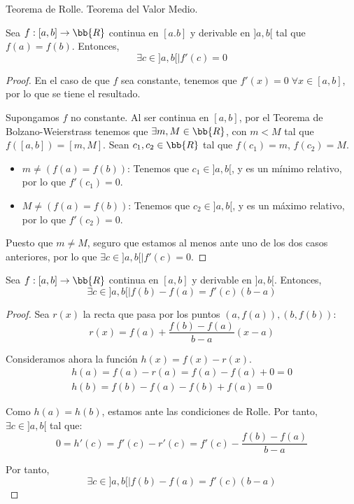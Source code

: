 \documentclass[12pt]{article}
\begin{document}
    \begin{ejercicio} 
Teorema de Rolle. Teorema del Valor Medio.

\begin{teo} 
    Sea $f:[a,b] \to \bb{R}$ continua en $[a.b]$ y derivable en $]a,b[$ tal que $f(a)=f(b)$. Entonces, $$\exists c\in ]a,b[ \mid f'(c)=0$$
\end{teo}
\begin{proof}
    En el caso de que $f$ sea constante, tenemos que $f'(x)=0\;\forall x\in [a,b]$, por lo que se tiene el resultado.

    Supongamos $f$ no constante. Al ser continua en $[a,b]$, por el Teorema de Bolzano-Weierstrass tenemos que $\exists m,M\in \bb{R}$, con $m<M$ tal que $f([a,b])=[m,M]$. Sean $c_1, c_2\in \bb{R}$ tal que $f(c_1)=m$, $f(c_2)=M$.
    \begin{itemize}
        \item \underline{$m\neq (f(a)=f(b))$}: Tenemos que $c_1\in ]a,b[$, y es un mínimo relativo, por lo que $f'(c_1)=0$.

        \item \underline{$M\neq (f(a)=f(b))$}: Tenemos que $c_2\in ]a,b[$, y es un máximo relativo, por lo que $f'(c_2)=0$.
    \end{itemize}
    Puesto que $m\neq M$, seguro que estamos al menos ante uno de los dos casos anteriores, por lo que $\exists c\in ]a,b[\mid f'(c)=0$.
\end{proof}

\begin{teo} 
    Sea $f:[a,b]\to \bb{R}$ continua en $[a,b]$ y derivable en $]a,b[$. Entonces,
    $$\exists c\in ]a,b[ \mid f(b)-f(a)=f'(c)(b-a)$$
\end{teo}
\begin{proof}
    Sea $r(x)$ la recta que pasa por los puntos $(a,f(a)),(b,f(b))$:
    \begin{equation*}
        r(x)=f(a)+\frac{f(b)-f(a)}{b-a}(x-a)
    \end{equation*}

    Consideramos ahora la función $h(x)=f(x)-r(x)$.
    \begin{gather*}
        h(a)=f(a)-r(a)=f(a)-f(a)+0 = 0
        \\
        h(b)=f(b)-f(a)-f(b)+f(a) = 0
    \end{gather*}

    Como $h(a)=h(b)$, estamos ante las condiciones de Rolle. Por tanto, $\exists c\in ]a,b[$ tal que:
    \begin{equation*}
        0=h'(c) = f'(c)-r'(c) = f'(c)-\frac{f(b)-f(a)}{b-a}
    \end{equation*}

    Por tanto,
    \begin{equation*}
        \exists c\in ]a,b[ \mid f(b)-f(a)=f'(c)(b-a)
    \end{equation*}
\end{proof}
    
\end{ejercicio}
\end{document}
